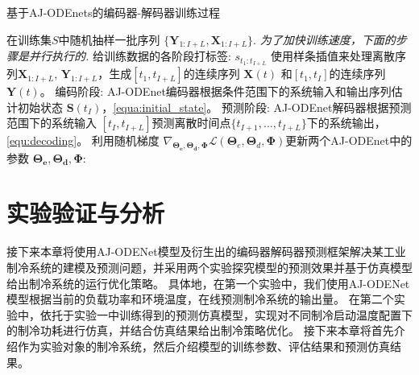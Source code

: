 \begin{algorithm*}[]
\caption{ 基于AJ-ODEnets的编码器-解码器训练过程 }
\label{alg:training}
\begin{algorithmic}[1]
\State  在训练集$S$中随机抽样一批序列 $\{\boldsymbol{Y}_{1:I+L}, {\boldsymbol {X}}_{1:I+L}\}$.
\State \text{//}\textit{为了加快训练速度，下面的步骤是并行执行的.}
\State 给训练数据的各阶段打标签: $s_{t_1:t_{I+L}}$
\State 使用样条插值来处理离散序列${\boldsymbol {X}}_{1:I+L}$, $\boldsymbol{Y}_{1:I+L}$，生成$[t_1, t_{I+L}]$的连续序列 $\boldsymbol X(t)$ 和$[t_1, t_{I}]$的连续序列 $\boldsymbol Y(t)$。
\State 编码阶段: AJ-ODEnet编码器根据条件范围下的系统输入和输出序列估计初始状态 $\boldsymbol{S}\left(t_{I}\right)$，\eqref{equa:initial_state}。
\State 预测阶段: AJ-ODEnet解码器根据预测范围下的系统输入 $[t_I, t_{I+L}]$预测离散时间点$\{t_{I+1}, \dots, t_{I+L}\}$下的系统输出，\eqref{equ:decoding}。
\State 利用随机梯度 $\nabla_{\boldsymbol{\Theta_{e}}, \boldsymbol{\Theta_{d}}, \boldsymbol \Phi}\mathcal{L}\left(\boldsymbol{\Theta}_{e}, \boldsymbol{\Theta}_{d}, \boldsymbol{\Phi}\right)$更新两个AJ-ODEnet中的参数 $\boldsymbol{\Theta_{e}}, \boldsymbol{\Theta_{d}}, \boldsymbol \Phi$:
\EndFor
\EndFor
\end{algorithmic}
\end{algorithm*}


\section{实验验证与分析}
\label{sec:evalutaion}
接下来本章将使用AJ-ODENet模型及衍生出的编码器解码器预测框架解决某工业制冷系统的建模及预测问题，并采用两个实验探究模型的预测效果并基于仿真模型给出制冷系统的运行优化策略。
具体地，在第一个实验中，我们使用AJ-ODENet模型根据当前的负载功率和环境温度，在线预测制冷系统的输出量。
在第二个实验中，依托于实验一中训练得到的预测仿真模型，实现对不同制冷启动温度配置下的制冷功耗进行仿真，并结合仿真结果给出制冷策略优化。
接下来本章将首先介绍作为实验对象的制冷系统，然后介绍模型的训练参数、评估结果和预测仿真结果。


